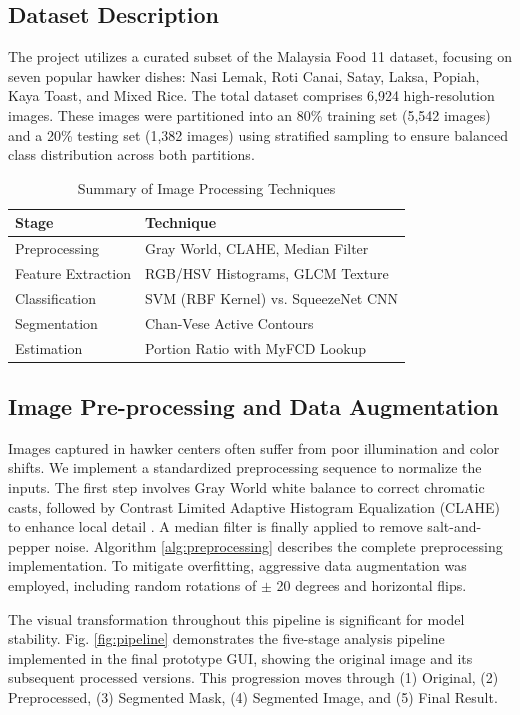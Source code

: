 \documentclass[conference, a4paper]{IEEEtran}
\begin{document}
\subsection{Dataset Description}
The project utilizes a curated subset of the Malaysia Food 11 dataset, focusing on seven popular hawker dishes: Nasi Lemak, Roti Canai, Satay, Laksa, Popiah, Kaya Toast, and Mixed Rice. The total dataset comprises 6,924 high-resolution images. These images were partitioned into an 80\% training set (5,542 images) and a 20\% testing set (1,382 images) using stratified sampling to ensure balanced class distribution across both partitions.

\begin{table}[!t]
\caption{Summary of Image Processing Techniques}
\begin{center}
\begin{tabular}{ll}
\toprule
\textbf{Stage} & \textbf{Technique} \\
\midrule
Preprocessing & Gray World, CLAHE, Median Filter \\
Feature Extraction & RGB/HSV Histograms, GLCM Texture \\
Classification & SVM (RBF Kernel) vs. SqueezeNet CNN \\
Segmentation & Chan-Vese Active Contours \\
Estimation & Portion Ratio with MyFCD Lookup \\
\bottomrule
\end{tabular}
\label{tab:proc_summary}
\end{center}
\end{table}

\subsection{Image Pre-processing and Data Augmentation}
Images captured in hawker centers often suffer from poor illumination and color shifts. We implement a standardized preprocessing sequence to normalize the inputs. The first step involves Gray World white balance to correct chromatic casts, followed by Contrast Limited Adaptive Histogram Equalization (CLAHE) to enhance local detail \cite{Zuiderveld1994}. A median filter is finally applied to remove salt-and-pepper noise. Algorithm \ref{alg:preprocessing} describes the complete preprocessing implementation. To mitigate overfitting, aggressive data augmentation was employed, including random rotations of $\pm$ 20 degrees and horizontal flips.

The visual transformation throughout this pipeline is significant for model stability. Fig. \ref{fig:pipeline} demonstrates the five-stage analysis pipeline implemented in the final prototype GUI, showing the original image and its subsequent processed versions. This progression moves through (1) Original, (2) Preprocessed, (3) Segmented Mask, (4) Segmented Image, and (5) Final Result.
\end{document}
